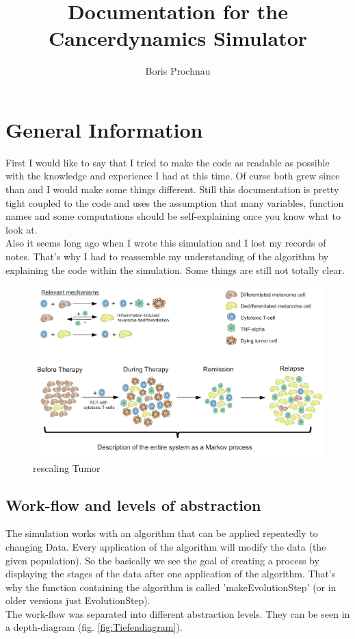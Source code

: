 \documentclass[a4paper,10pt]{scrartcl}
\title{Documentation for the Cancerdynamics Simulator}
\author{Boris Prochnau}
\begin{document}
\maketitle
\tableofcontents
\newpage
\section{General Information}
First I would like to say that I tried to make the code as readable as possible with the knowledge and experience I had at this time. Of curse both grew since than and I would make some things different. Still this documentation is pretty tight coupled to the code and uses the assumption that many variables, function names and some computations should be self-explaining once you know what to look at. \\
Also it seems long ago when I wrote this simulation and I lost my records of notes. That's why I had to reassemble my understanding of the algorithm by explaining the code within the simulation. Some things are still not totally clear.
\begin{figure}
\centering
\includegraphics[width=1\linewidth]{Bilder/Schema_Tumor_rescale}
\caption{rescaling Tumor}
\label{fig:Schema_Tumor_rescale}
\end{figure}

\subsection{Work-flow and levels of abstraction}
The simulation works with an algorithm that can be applied repeatedly to changing Data. Every application of the algorithm will modify the data (the given population). So the basically we see the goal of creating a process by displaying the stages of the data after one application of the algorithm. That's why the function containing the algorithm is called 'makeEvolutionStep' (or in older versions just EvolutionStep).\\
The work-flow was separated into different abstraction levels. They can be seen in a depth-diagram (fig. \ref{fig:Tiefendiagram}). 
\end{document}
